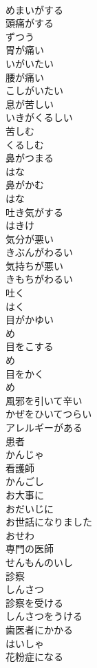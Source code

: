 \documentclass[8pt]{extreport}
\begin{document}
\begin{CJK}{UTF8}{min}
\\	めまいがする	
\\	頭痛がする	
\\	ずつう
\\	胃が痛い	
\\	いがいたい
\\	腰が痛い	
\\	こしがいたい
\\	息が苦しい	
\\	いきがくるしい
\\	苦しむ	
\\	くるしむ
\\	鼻がつまる	
\\	はな
\\	鼻がかむ	
\\	はな
\\	吐き気がする	
\\	はきけ
\\	気分が悪い	
\\	きぶんがわるい
\\	気持ちが悪い	
\\	きもちがわるい
\\	吐く	
\\	はく
\\	目がかゆい	
\\	め
\\	目をこする	
\\	め
\\	目をかく	
\\	め
\\	風邪を引いて辛い	
\\	かぜをひいてつらい
\\	アレルギーがある	
\\	患者	
\\	かんじゃ
\\	看護師	
\\	かんごし
\\	お大事に	
\\	おだいじに
\\	お世話になりました	
\\	おせわ
\\	専門の医師	
\\	せんもんのいし
\\	診察	
\\	しんさつ
\\	診察を受ける	
\\	しんさつをうける
\\	歯医者にかかる	
\\	はいしゃ
\\	花粉症になる	

\end{CJK}
\end{document}
